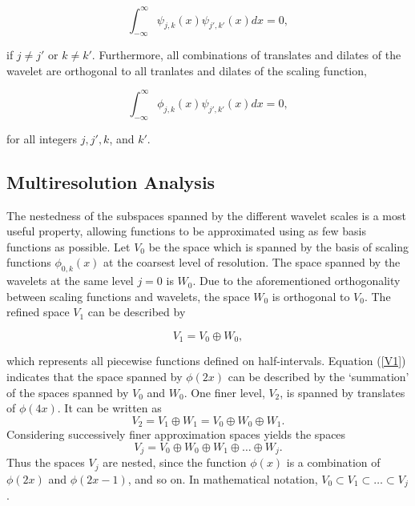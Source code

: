 \documentclass[11pt]{article}
\begin{document}
\begin{equation}
\int_{-\infty}^{\infty} \psi_{j,k}(x) \psi_{j',k'}(x) dx = 0,
\end{equation}

if $j \neq j'$ or $k \neq k'$. Furthermore, all combinations of translates and dilates of the wavelet are orthogonal
to all tranlates and dilates of the scaling function,

\begin{equation}
\int_{-\infty}^{\infty} \phi_{j,k}(x) \psi_{j',k'}(x) dx = 0,
\end{equation}

for all integers $j,j',k$, and $k'$.

\subsection{Multiresolution Analysis}
The nestedness of the subspaces spanned by the different wavelet scales is a most useful property, allowing functions
to be approximated using as few basis functions as possible. Let $V_0$ be the space which is spanned by the basis of 
scaling functions $\phi_{0,k}(x)$ at the coarsest level of resolution. The space spanned by the wavelets at the same
level $j=0$ is $W_0$. Due to the aforementioned orthogonality between scaling functions and wavelets, the space
$W_0$ is orthogonal to $V_0$. The refined space $V_1$ can be described by

\begin{equation}
V_1 = V_0 \oplus W_0,
\label{V1}
\end{equation}

which represents all piecewise functions defined on half-intervals. Equation (\ref{V1}) indicates that the space spanned by 
$\phi(2x)$ can be described by the `summation' of the spaces spanned by
$V_0$ and $W_0$. One finer level, $V_2$, is spanned by translates of $\phi(4x)$. It can be written as
\begin{equation}
V_2 = V_1 \oplus W_1 = V_0 \oplus W_0 \oplus W_1.
\label{V2}
\end{equation}
Considering successively finer approximation spaces yields the spaces
\begin{equation}
V_j = V_0 \oplus W_0 \oplus W_1 \oplus \dots \oplus W_j.
\end{equation}
Thus the spaces $V_j$ are nested, since the function $\phi(x)$ is a combination of $\phi(2x)$ and $\phi(2x-1)$, and so on. 
In mathematical notation, $V_0 \subset V_1 \subset \dots \subset V_j$.
\end{document}
